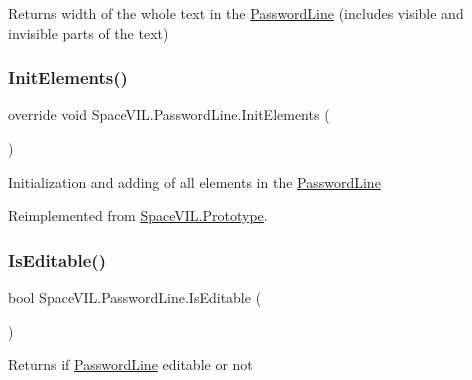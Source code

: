 Returns width of the whole text in the \mbox{\hyperlink{class_space_v_i_l_1_1_password_line}{Password\+Line}} (includes visible and invisible parts of the text) 

\mbox{\label{class_space_v_i_l_1_1_password_line_a2cea928d45c4c440435531abacbb5799}} 
\subsubsection{\texorpdfstring{Init\+Elements()}{InitElements()}}
{\footnotesize\ttfamily override void Space\+V\+I\+L.\+Password\+Line.\+Init\+Elements (\begin{DoxyParamCaption}{ }\end{DoxyParamCaption})\hspace{0.3cm}{\ttfamily [virtual]}}



Initialization and adding of all elements in the \mbox{\hyperlink{class_space_v_i_l_1_1_password_line}{Password\+Line}} 



Reimplemented from \mbox{\hyperlink{class_space_v_i_l_1_1_prototype_ac3379fe02923ee155b5b0084abf27420}{Space\+V\+I\+L.\+Prototype}}.

\mbox{\label{class_space_v_i_l_1_1_password_line_a1defdc8c76e67ca62653ce1c06277e88}} 
\subsubsection{\texorpdfstring{Is\+Editable()}{IsEditable()}}
{\footnotesize\ttfamily bool Space\+V\+I\+L.\+Password\+Line.\+Is\+Editable (\begin{DoxyParamCaption}{ }\end{DoxyParamCaption})}



Returns if \mbox{\hyperlink{class_space_v_i_l_1_1_password_line}{Password\+Line}} editable or not 


